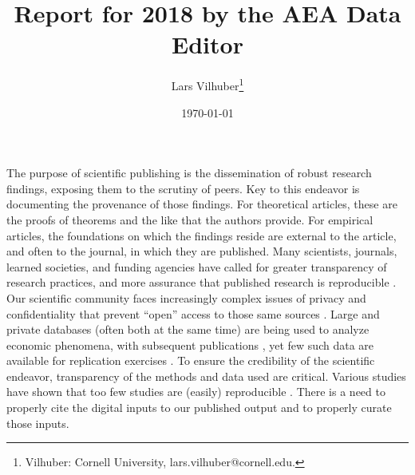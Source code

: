 \documentclass[PP]{AEA}
\begin{document}
\title{Report for 2018 by the AEA Data Editor }
\author{Lars Vilhuber\thanks{%
Vilhuber: Cornell University, lars.vilhuber@cornell.edu.}}
\date{\today}
\JEL{}




\maketitle


The purpose of scientific publishing is the dissemination of robust research findings, exposing them to the scrutiny of peers. Key to this endeavor is documenting the provenance of those findings. For theoretical articles, these are the proofs of theorems and the like that the authors provide. For empirical articles, the foundations on which the findings reside are external to the article, and often to the journal, in which they are published. Many scientists,  journals, learned societies, and funding agencies have called for greater transparency of research practices, and more assurance that published research is reproducible \citep{Stodden2016-uc,Fuentes2016-wz,Moffitt2016-wl,Camerer2016-kl,Bollen2015-vb,Joskow2015-hd,ChristensenTransparencyReproducibilityCredibility2018}. Our scientific community faces  increasingly complex issues of privacy and confidentiality that prevent ``open'' access to those same sources \citep{Anderson12009,abowdschmutte.aer.2018}. Large and private databases (often both at the same time) are being used to analyze economic phenomena, with subsequent publications \citep{BakerWagePolicyFirm1994,LazearAm.Econ.Rev.2000,BaileySocialConnectednessMeasurement2018,Chen2017,HallILRReview2018}, yet few such data are available for replication exercises \citep{JengAm.Econ.Rev.2016}. To ensure the credibility of the scientific endeavor, transparency of the methods and data used are critical. Various studies have shown that too few studies are (easily) reproducible \citep{McCullough2007-zx,McCullough2006-cz,AndersonJ.Econ.Methodol.2008,AndersonFed.ReserveBankStLouisRev.1994}. There is a need to properly cite the digital inputs to our published output and to properly curate those inputs.  
\end{document}
